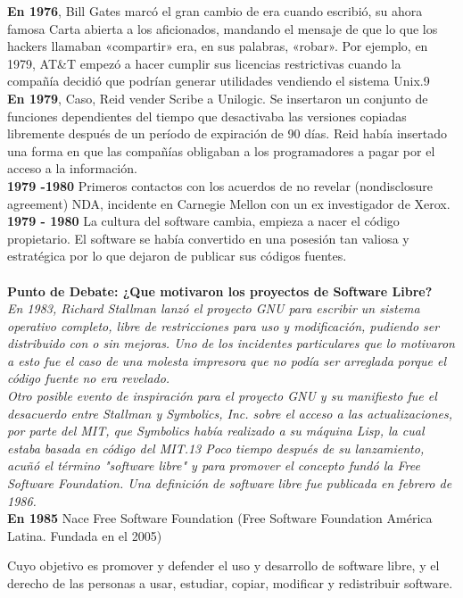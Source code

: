 {\bf En 1976}, Bill Gates marcó el gran cambio de era cuando escribió, su ahora famosa Carta abierta a los aficionados, mandando el mensaje de que lo que los hackers llamaban «compartir» era, en sus palabras, «robar». Por ejemplo, en 1979, AT\&T empezó a hacer cumplir sus licencias restrictivas cuando la compañía decidió que podrían generar utilidades vendiendo el sistema Unix.9
\\
{\bf En 1979}, Caso, Reid vender Scribe a Unilogic. Se insertaron un conjunto de funciones dependientes del tiempo que desactivaba las versiones copiadas libremente después de un período de expiración de 90 días.
Reid había insertado una forma en que las compañías obligaban a los programadores a pagar por el acceso a la información.
\\
{\bf 1979 -1980} Primeros contactos con los acuerdos de no revelar (nondisclosure agreement) NDA, incidente en Carnegie Mellon con un ex investigador de Xerox.
\\
{\bf 1979 - 1980} La cultura del software cambia, empieza a nacer el código propietario.
El software se había convertido en una posesión tan valiosa y estratégica por lo que dejaron de publicar sus códigos fuentes.
\\
\\
{\bf Punto de Debate: ¿Que motivaron los proyectos de Software Libre?}
{\it 
\\
En 1983, Richard Stallman lanzó el proyecto GNU para escribir un sistema operativo completo, libre de restricciones para uso y modificación, pudiendo ser distribuido con o sin mejoras. Uno de los incidentes particulares que lo motivaron a esto fue el caso de una molesta impresora que no podía ser arreglada porque el código fuente no era revelado.
\\
Otro posible evento de inspiración para el proyecto GNU y su manifiesto fue el desacuerdo entre Stallman y Symbolics, Inc. sobre el acceso a las actualizaciones, por parte del MIT, que Symbolics había realizado a su máquina Lisp, la cual estaba basada en código del MIT.13 Poco tiempo después de su lanzamiento, acuñó el término "software libre" y para promover el concepto fundó la Free Software Foundation.
Una definición de software libre fue publicada en febrero de 1986.
}
\\
{\bf En 1985} Nace Free Software Foundation (Free Software Foundation América Latina. Fundada en el 2005)

Cuyo objetivo es promover y defender el uso y desarrollo de software libre, y el derecho de las personas a usar, estudiar, copiar, modificar y redistribuir software.


